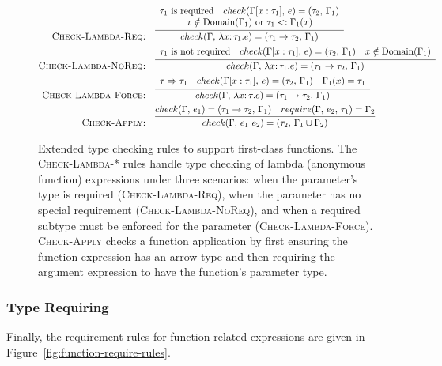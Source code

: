 \documentclass[peerreview, 10pt]{IEEEtran}
\newcommand{\funct}[3]{\ensuremath{\lambda #1\mathsf{:}\,#2.#3}}
\newcommand{\apply}[2]{\ensuremath{#1\ #2}}
\newcommand{\arrowt}[2]{\ensuremath{{#1}\rightarrow{#2}}}
\newcommand{\checktype}[4]{\ensuremath{{check}(#1,\,#2)=(#3,\,#4)}}
\newcommand{\requiretype}[4]{\ensuremath{{require}(#1,\,#2,\,#3)=#4}}
\newcommand{\required}[1]{\ensuremath{#1\text{ is required}}}
\newcommand{\nrequired}[1]{\ensuremath{#1\text{ is not required}}}
\newcommand{\forcerequire}[2]{\ensuremath{#1\Rightarrow#2}}
\begin{document}
\begin{figure*}[ht]
\centering
\begin{framed}
\begin{align*}
\text{\textsc{Check-Lambda-Req:}} &\quad \infer{\checktype{\Gamma}{\funct{x}{\tau_1}{e}}{\arrowt{\tau_1}{\tau_2}}{\Gamma_1}}{
\begin{array}{c}
\required{\tau_1} \quad \checktype{\Gamma[x:\tau_1]}{e}{\tau_2}{\Gamma_1}\\
x \notin \text{Domain}(\Gamma_1) \text{ or } \tau_1 <: \Gamma_1(x)
\end{array}} \\
\text{\textsc{Check-Lambda-NoReq:}} &\quad \infer{\checktype{\Gamma}{\funct{x}{\tau_1}{e}}{\arrowt{\tau_1}{\tau_2}}{\Gamma_1}}{
\begin{array}{c}
\nrequired{\tau_1} \quad
\checktype{\Gamma[x:\tau_1]}{e}{\tau_2}{\Gamma_1} \quad x \notin \text{Domain}(\Gamma_1)
\end{array}
} \\
\text{\textsc{Check-Lambda-Force:}} &\quad \infer{\checktype{\Gamma}{\funct{x}{\tau}{e}}{\arrowt{\tau_1}{\tau_2}}{\Gamma_1}}{
\begin{array}{c}
\forcerequire{\tau}{\tau_1} \quad \checktype{\Gamma[x:\tau_1]}{e}{\tau_2}{\Gamma_1} \quad \Gamma_1(x) = \tau_1
\end{array}
} \\
\text{\textsc{Check-Apply:}} &\quad \infer{\checktype{\Gamma}{\apply{e_1}{e_2}}{\tau_2}{\Gamma_1 \cup \Gamma_2}}{\checktype{\Gamma}{e_1}{\arrowt{\tau_1}{\tau_2}}{\Gamma_1} \quad \requiretype{\Gamma}{e_2}{\tau_1}{\Gamma_2}}
\end{align*}
\end{framed}
\caption{Extended type checking rules to support first-class functions. The \textsc{Check-Lambda-*} rules handle type checking of lambda (anonymous function) expressions under three scenarios: when the parameter's type is required (\textsc{Check-Lambda-Req}), when the parameter has no special requirement (\textsc{Check-Lambda-NoReq}), and when a required subtype must be enforced for the parameter (\textsc{Check-Lambda-Force}). \textsc{Check-Apply} checks a function application by first ensuring the function expression has an arrow type and then requiring the argument expression to have the function's parameter type.}
\label{fig:function-check-rules}
\end{figure*}

\subsubsection{Type Requiring}
Finally, the requirement rules for function-related expressions are given in Figure~\ref{fig:function-require-rules}.
\end{document}
